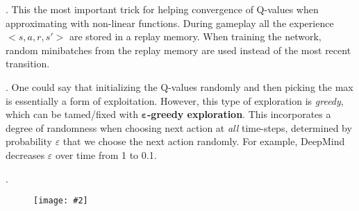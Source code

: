 \documentclass[12pt]{article}
\newcommand\myfig[2][0.3\textwidth]{\begin{figure}[h!]\centering\texttt{[image: \#2]}\end{figure}}
\newcommand{\myspace}{\vspace{2\bigskipamount}}
\newcommand\p{\Needspace{10\baselineskip} \noindent}
\begin{document}
\myspace
\p {}. This the most important trick for helping convergence of Q-values when approximating with non-linear functions. During gameplay all the experience $<s, a, r, s'>$ are stored in a replay memory. When training the network, random minibatches from the replay memory are used instead of the most recent transition. 

\myspace
\p {}. One could say that initializing the Q-values randomly and then picking the max is essentially a form of exploitation. However, this type of exploration is \textit{greedy}, which can be tamed/fixed with \textbf{$\bm{\varepsilon}$-greedy exploration}. This incorporates a degree of randomness when choosing next action at \textit{all} time-steps, determined by probability $\varepsilon$ that we choose the next action randomly. For example, DeepMind decreases $\varepsilon$ over time from 1 to 0.1. 

\myspace
\p {}. 

\myfig[0.75\textwidth]{DRL_alg.PNG}
\end{document}
